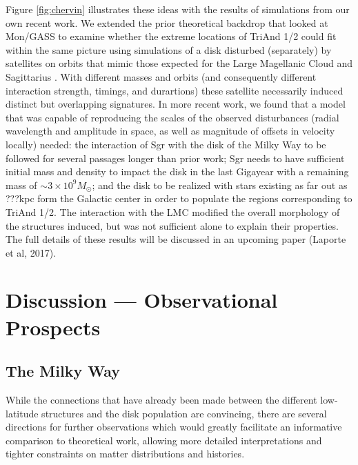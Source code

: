 \documentclass[galaxies,article,submit,moreauthors,pdftex,10pt,a4paper]{mdpi}
\begin{document}
Figure \ref{fig:chervin} illustrates these ideas with the results of simulations from our own recent work.
We extended the prior theoretical backdrop that looked at Mon/GASS to examine whether the extreme locations of TriAnd 1/2 could fit within the same picture using simulations of a disk disturbed (separately) by satellites on orbits that mimic those expected for the Large Magellanic Cloud and Sagittarius \cite{laporte17}.
With different masses and orbits (and consequently different interaction  strength, timings, and durartions) these satellite necessarily induced distinct but overlapping signatures.
In  more recent work, we found that a model that was capable of reproducing the scales of the observed disturbances (radial wavelength and  amplitude in space, as well as magnitude of offsets in velocity locally) needed:
the  interaction of Sgr with the disk of the Milky Way to be followed for several passages longer than prior work;
Sgr needs to have sufficient initial mass and density to impact the disk in the last Gigayear with a remaining mass of $\sim3\times10^{9} M_{\odot}$;
and the disk to be realized with stars existing as far out as ???kpc form the Galactic center in order to populate the regions corresponding to TriAnd 1/2.
The interaction with the LMC modified the overall morphology of the structures induced, but was not sufficient alone to explain their properties.
The full details of these results will be discussed in an upcoming paper (Laporte et al, 2017).

\section{Discussion --- Observational Prospects}

\subsection{The Milky Way}

While the connections that have already been made between the different low-latitude structures and the disk population are convincing, there are several directions for further observations which would greatly facilitate an informative comparison to theoretical work, allowing more detailed interpretations and tighter constraints on matter distributions and histories.
\end{document}
